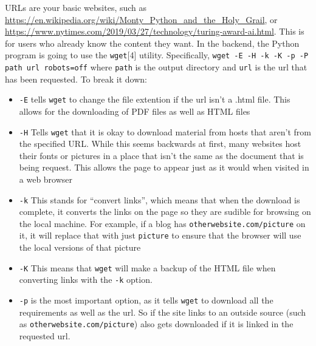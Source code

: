 \documentclass{article}
\begin{document}
URLs are your basic websites, such as
\url{https://en.wikipedia.org/wiki/Monty_Python_and_the_Holy_Grail},
or
\url{https://www.nytimes.com/2019/03/27/technology/turing-award-ai.html}. This
is for users who already know the content they want. In the backend,
the Python program is going to use the \texttt{wget}[4]
utility. Specifically, \texttt{wget -E -H -k -K -p -P path url
  robots=off} where \texttt{path} is the output directory and
\texttt{url} is the url that has been requested. To break it down:
\begin{itemize}
  \item \texttt{-E} tells \texttt{wget} to change the file extention
    if the url isn't a .html file. This allows for the downloading of
    PDF files as well as HTML files
  \item \texttt{-H} Tells \texttt{wget} that it is okay to download
    material from hosts that aren't from the specified URL. While this
    seems backwards at first, many websites host their fonts or
    pictures in a place that isn't the same as the document that is
    being request. This allows the page to appear just as it would
    when visited in a web browser
  \item \texttt{-k} This stands for ``convert links'', which means
    that when the download is complete, it converts the links on the
    page so they are sudible for browsing on the local machine. For
    example, if a blog has \texttt{otherwebsite.com/picture} on it, it
    will replace that with just \texttt{picture} to ensure that the
    browser will use the local versions of that picture
  \item \texttt{-K} This means that \texttt{wget} will make a backup
    of the HTML file when converting links with the \texttt{-k}
    option.
  \item \texttt{-p} is the most important option, as it tells
    \texttt{wget} to download all the requirements as well as the
    url. So if the site links to an outside source (such as
    \texttt{otherwebsite.com/picture}) also gets downloaded if it is
    linked in the requested url.
 \end{itemize}
\end{document}
